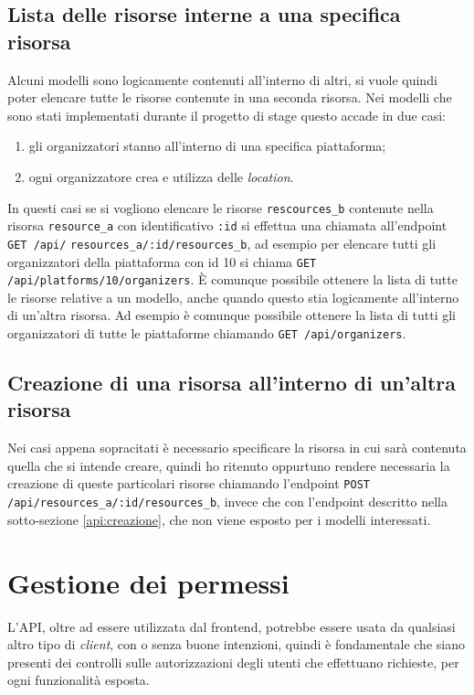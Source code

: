 \subsection{Lista delle risorse interne a una specifica risorsa} \label{api:lista-risorsa}
Alcuni modelli sono logicamente contenuti all'interno di altri, si vuole quindi poter elencare tutte le risorse contenute in una seconda risorsa. Nei modelli che sono stati implementati durante il progetto di stage questo accade in due casi:
\begin{enumerate}
	\item gli organizzatori stanno all'interno di una specifica piattaforma;
	\item ogni organizzatore crea e utilizza delle \emph{location}.
\end{enumerate} In questi casi se si vogliono elencare le risorse \verb|rescources_b| contenute nella risorsa \verb|resource_a| con identificativo \verb|:id| si effettua una chiamata all'endpoint \verb|GET /api/| \verb|resources_a/:id/resources_b|, ad esempio per elencare tutti gli organizzatori della piattaforma con id 10 si chiama \verb|GET /api/platforms/10/organizers|. È comunque possibile ottenere la lista di tutte le risorse relative a un modello, anche quando questo stia logicamente all'interno di un'altra risorsa. Ad esempio è comunque possibile ottenere la lista di tutti gli organizzatori di tutte le piattaforme chiamando \verb|GET /api/organizers|.

\subsection{Creazione di una risorsa all'interno di un'altra risorsa} \label{api:creazione-risorsa}
Nei casi appena sopracitati è necessario specificare la risorsa in cui sarà contenuta quella che si intende creare, quindi ho ritenuto oppurtuno rendere necessaria la creazione di queste particolari risorse chiamando l'endpoint \verb|POST /api/resources_a/:id/resources_b|, invece che con l'endpoint descritto nella sotto-sezione \ref{api:creazione}, che non viene esposto per i modelli interessati.


\section{Gestione dei permessi}

L'API, oltre ad essere utilizzata dal frontend, potrebbe essere usata da qualsiasi altro tipo di \emph{client}, con o senza buone intenzioni, quindi è fondamentale che siano presenti dei controlli sulle autorizzazioni degli utenti che effettuano richieste, per ogni funzionalità esposta.

